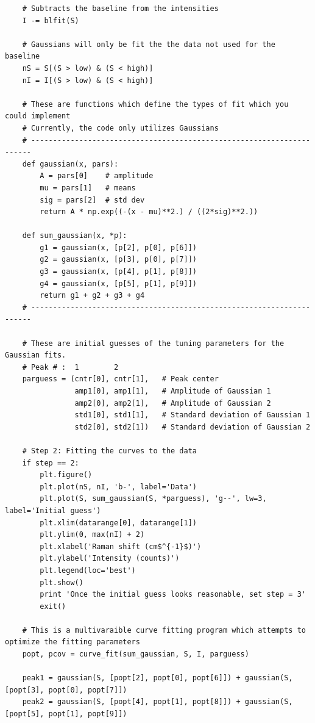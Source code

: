\documentclass[journal=jpccck,manuscript=suppinfo,email=true]{achemso}
\begin{document}
\begin{verbatim}
    # Subtracts the baseline from the intensities
    I -= blfit(S)

    # Gaussians will only be fit the the data not used for the baseline
    nS = S[(S > low) & (S < high)]
    nI = I[(S > low) & (S < high)]

    # These are functions which define the types of fit which you could implement
    # Currently, the code only utilizes Gaussians
    # ----------------------------------------------------------------------
    def gaussian(x, pars):
        A = pars[0]    # amplitude
        mu = pars[1]   # means
        sig = pars[2]  # std dev
        return A * np.exp((-(x - mu)**2.) / ((2*sig)**2.))

    def sum_gaussian(x, *p):
        g1 = gaussian(x, [p[2], p[0], p[6]])
        g2 = gaussian(x, [p[3], p[0], p[7]])
        g3 = gaussian(x, [p[4], p[1], p[8]])
        g4 = gaussian(x, [p[5], p[1], p[9]])
        return g1 + g2 + g3 + g4
    # ----------------------------------------------------------------------

    # These are initial guesses of the tuning parameters for the Gaussian fits.
    # Peak # :  1        2
    parguess = (cntr[0], cntr[1],   # Peak center
                amp1[0], amp1[1],   # Amplitude of Gaussian 1
                amp2[0], amp2[1],   # Amplitude of Gaussian 2
                std1[0], std1[1],   # Standard deviation of Gaussian 1
                std2[0], std2[1])   # Standard deviation of Gaussian 2

    # Step 2: Fitting the curves to the data
    if step == 2:
        plt.figure()
        plt.plot(nS, nI, 'b-', label='Data')
        plt.plot(S, sum_gaussian(S, *parguess), 'g--', lw=3, label='Initial guess')
        plt.xlim(datarange[0], datarange[1])
        plt.ylim(0, max(nI) + 2)
        plt.xlabel('Raman shift (cm$^{-1}$)')
        plt.ylabel('Intensity (counts)')
        plt.legend(loc='best')
        plt.show()
        print 'Once the initial guess looks reasonable, set step = 3'
        exit()

    # This is a multivaraible curve fitting program which attempts to optimize the fitting parameters
    popt, pcov = curve_fit(sum_gaussian, S, I, parguess)

    peak1 = gaussian(S, [popt[2], popt[0], popt[6]]) + gaussian(S, [popt[3], popt[0], popt[7]])
    peak2 = gaussian(S, [popt[4], popt[1], popt[8]]) + gaussian(S, [popt[5], popt[1], popt[9]])


\end{verbatim}
\end{document}
